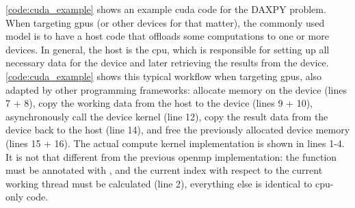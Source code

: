 \autoref{code:cuda_example} shows an example \gls{cuda} code for the DAXPY problem. 
When targeting \glspl{gpu} (or other devices for that matter), the commonly used model is to have a host code that offloads some computations to one or more devices. 
In general, the host is the \gls{cpu}, which is responsible for setting up all necessary data for the device and later retrieving the results from the device. 
\autoref{code:cuda_example} shows this typical workflow when targeting \glspl{gpu}, also adapted by other programming frameworks: allocate memory on the device (lines 7 + 8), copy the working data from the host to the device (lines 9 + 10), asynchronously call the device kernel (line 12), copy the result data from the device back to the host (line 14), and free the previously allocated device memory (lines 15 + 16). 
The actual compute kernel implementation is shown in lines 1-4. 
It is not that different from the previous \gls{openmp} implementation: the function must be annotated with , and the current index with respect to the current working thread must be calculated (line 2), everything else is identical to \gls{cpu}-only code. 



